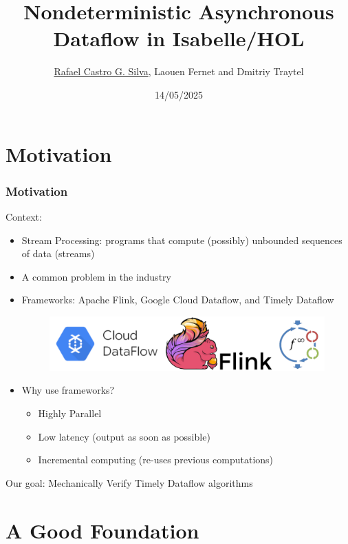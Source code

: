 \documentclass[fleqn,aspectratio=169,10pt]{beamer}
\title[Nondeterministic Asynchronous Dataflow in Isabelle/HOL]{Nondeterministic Asynchronous Dataflow in Isabelle/HOL}
\author[Rafael, Laouen and Dmitriy]{
  \underline{Rafael Castro G. Silva}, Laouen Fernet and  Dmitriy Traytel\\\medskip
  }
\date{14/05/2025}
\institute[UCPH]{
  Department of Computer Science \\
  University of Copenhagen}
\begin{document}

\begin{frame}
  \titlepage
\end{frame}

\section{Motivation}

\begin{frame}[fragile]
  \frametitle{Motivation}
  \begin{block}{Context:}
  \begin{itemize}
    \item Stream Processing: programs that compute (possibly) unbounded sequences of data (streams)
    \item A common problem in the industry
    \item Frameworks: Apache Flink, Google Cloud Dataflow, and Timely Dataflow
          \begin{figure}
            \centering
            \includegraphics[scale=0.1]{all}
          \end{figure}
    \item Why use frameworks?
          \begin{itemize}
            \item Highly Parallel
            \item Low latency (output as soon as possible)
            \item Incremental computing (re-uses previous computations)
          \end{itemize}
  \end{itemize}
  \pause
  \end{block}
  \begin{block}{Our goal:}
    Mechanically Verify Timely Dataflow algorithms
  \end{block}
\end{frame}

\section{A Good Foundation}
\end{document}
